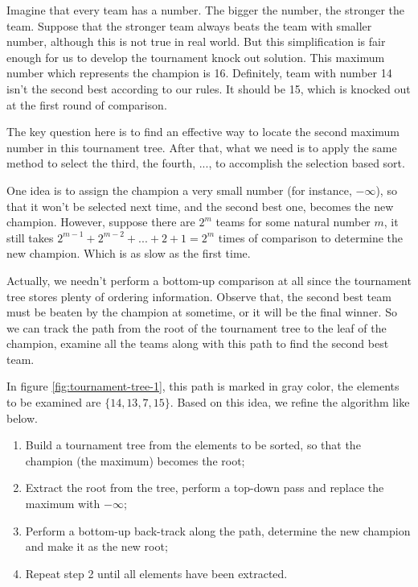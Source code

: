 \documentclass[UTF8]{article}
\begin{document}
Imagine that every team has a number. The bigger the number, the stronger the team. Suppose
that the stronger team always beats the team with smaller number, although this is not true
in real world. But this simplification is fair enough for us to develop the tournament knock
out solution. This maximum number which represents the champion is 16. Definitely, team with
number 14 isn't the second best according to our rules. It should be 15, which is knocked
out at the first round of comparison.

The key question here is to find an effective way to locate the second maximum number in this
tournament tree. After that, what we need is to apply the same method to select the third,
the fourth, ..., to accomplish the selection based sort.

One idea is to assign the champion a very small number (for instance, $-\infty$),
so that it won't be selected next time, and the second best one, becomes the new champion.
However, suppose there are $2^m$ teams for some natural number $m$, it still takes
$2^{m-1} + 2^{m-2} + ... + 2 + 1 = 2^m$ times of comparison to determine the new
champion. Which is as slow as the first time.

Actually, we needn't perform a bottom-up comparison at all since the tournament tree
stores plenty of ordering information. Observe that, the second best team must
be beaten by the champion at sometime, or it will be the final winner. So we
can track the path from the root of the tournament tree to the leaf of the
champion, examine all the teams along with this path to find the second best team.

In figure \ref{fig:tournament-tree-1}, this path is marked in gray color, the elements
to be examined are $\{14, 13, 7, 15\}$. Based on this idea, we refine the algorithm
like below.

\begin{enumerate}
\item Build a tournament tree from the elements to be sorted, so that the champion (the maximum) becomes the root;
\item Extract the root from the tree, perform a top-down pass and replace the maximum with $-\infty$;
\item Perform a bottom-up back-track along the path, determine the new champion and make it as the new root;
\item Repeat step 2 until all elements have been extracted.
\end{enumerate}
\end{document}

